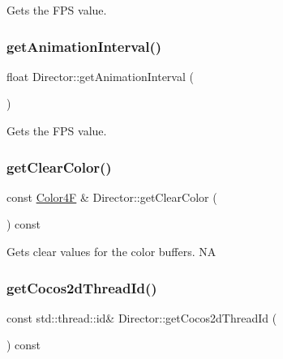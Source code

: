 Gets the F\+PS value. \mbox{\label{classDirector_ad69cc0f9296b7e083f1e91b3a84dad94}} 
\subsubsection{\texorpdfstring{get\+Animation\+Interval()}{getAnimationInterval()}\hspace{0.1cm}{\footnotesize\ttfamily [2/2]}}
{\footnotesize\ttfamily float Director\+::get\+Animation\+Interval (\begin{DoxyParamCaption}{ }\end{DoxyParamCaption})\hspace{0.3cm}{\ttfamily [inline]}}

Gets the F\+PS value. \mbox{\label{classDirector_a980149bba5adee4a719c7a6e6accc810}} 
\subsubsection{\texorpdfstring{get\+Clear\+Color()}{getClearColor()}}
{\footnotesize\ttfamily const \hyperlink{structColor4F}{Color4F} \& Director\+::get\+Clear\+Color (\begin{DoxyParamCaption}{ }\end{DoxyParamCaption}) const}

Gets clear values for the color buffers.  NA \mbox{\label{classDirector_a582225969ce1f42224c0387779f875e1}} 
\subsubsection{\texorpdfstring{get\+Cocos2d\+Thread\+Id()}{getCocos2dThreadId()}\hspace{0.1cm}{\footnotesize\ttfamily [1/2]}}
{\footnotesize\ttfamily const std\+::thread\+::id\& Director\+::get\+Cocos2d\+Thread\+Id (\begin{DoxyParamCaption}{ }\end{DoxyParamCaption}) const\hspace{0.3cm}{\ttfamily [inline]}}

